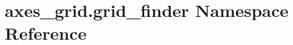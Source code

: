 \hypertarget{namespaceaxes__grid_1_1grid__finder}{}\section{axes\+\_\+grid.\+grid\+\_\+finder Namespace Reference}
\label{namespaceaxes__grid_1_1grid__finder}
